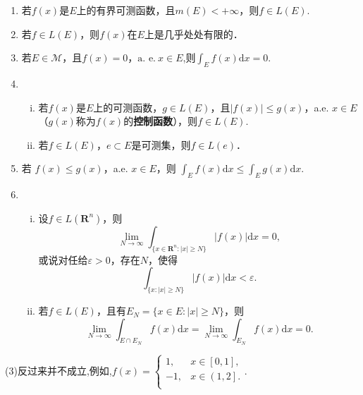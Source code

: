 \documentclass[../../main.tex]{subfiles}
\begin{document}
\begin{theorem}[积分的基本性质]\label{theorem:积分的基本性质}
\begin{enumerate}[(1)]
\item  若\(f(x)\)是\(E\)上的有界可测函数，且\(m(E) < +\infty\)，则$f \in L(E).$

\item  若\(f \in L(E)\)，则\(f(x)\)在\(E\)上是几乎处处有限的．

\item  若\(E \in \mathscr{M}\)，且\(f(x) = 0\)，\(\text{a. e.}\ x \in E\),则$\int_E f(x) \mathrm{d}x = 0.$

\item \begin{enumerate}[(i)]
\item 若\(f(x)\)是\(E\)上的可测函数，\(g \in L(E)\)，且\(|f(x)| \leqslant g(x)\)，a.e. \(x \in E\)（\(g(x)\)称为\(f(x)\)的\textbf{控制函数}），则\(f \in L(E)\).

\item 若\(f \in L(E)\)，\(e \subset E\)是可测集，则\(f \in L(e)\)．
\end{enumerate}

\item 若 \( f(x) \leqslant g(x) \)，a.e. \( x \in E \)，则 \( \int_E f(x)\mathrm{d}x \leqslant \int_E g(x)\mathrm{d}x \).

\item \begin{enumerate}[(i)]
\item 设\(f \in L(\mathbf{R}^n)\)，则
\[
\lim_{N \to \infty} \int_{\{x \in \mathbf{R}^n: |x| \geqslant N\}} |f(x)| \mathrm{d}x = 0,
\]
或说对任给\(\varepsilon > 0\)，存在\(N\)，使得
\[
\int_{\{x: |x| \geqslant N\}} |f(x)| \mathrm{d}x < \varepsilon.
\]

\item 若\(f \in L(E)\)，且有\(E_N = \{x \in E: |x| \geqslant N\}\)，则
\[
\lim_{N \to \infty} \int_{E \cap E_N} f(x) \mathrm{d}x =\lim_{N \to \infty} \int_{E_N} f(x) \mathrm{d}x = 0.
\]
\end{enumerate}
\end{enumerate}
\end{theorem}
\begin{remark}
(3)反过来并不成立,例如,$f\left( x \right) =\begin{cases}
1,&x\in \left[ 0,1 \right] ,\\
-1,&x\in \left( 1,2 \right] .\\
\end{cases}.$
\end{remark}
\end{document}
